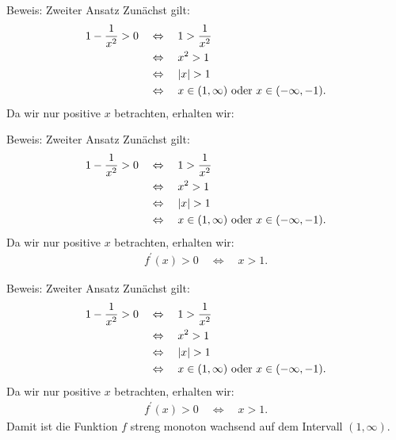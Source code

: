 \documentclass[10pt]{beamer}
\begin{document}
\begin{frame}{Beweis: Zweiter Ansatz}
    Zunächst gilt:
    \begin{align*}
        1 - \frac{1}{x^{2}} > 0 
        \quad & \Leftrightarrow \quad 1 > \frac{1}{x^{2}} \\
        \quad & \Leftrightarrow \quad x^{2} > 1 \\
        \quad & \Leftrightarrow \quad \left\vert x \right\vert > 1 \\
        \quad & \Leftrightarrow \quad \text{\( x \in \left(1, \infty \right)  \) oder \( x \in \left(- \infty, -1 \right) \)}.  
    \end{align*}
    Da wir nur positive \( x \) betrachten, erhalten wir:
\end{frame}



\begin{frame}{Beweis: Zweiter Ansatz}
    Zunächst gilt:
    \begin{align*}
        1 - \frac{1}{x^{2}} > 0 
        \quad & \Leftrightarrow \quad 1 > \frac{1}{x^{2}} \\
        \quad & \Leftrightarrow \quad x^{2} > 1 \\
        \quad & \Leftrightarrow \quad \left\vert x \right\vert > 1 \\
        \quad & \Leftrightarrow \quad \text{\( x \in \left(1, \infty \right)  \) oder \( x \in \left(- \infty, -1 \right) \)}.  
    \end{align*}
    Da wir nur positive \( x \) betrachten, erhalten wir:
    \begin{align*}
        f^{\prime}( x ) > 0 \quad \Leftrightarrow \quad x > 1.
    \end{align*}
\end{frame}



\begin{frame}{Beweis: Zweiter Ansatz}
    Zunächst gilt:
    \begin{align*}
        1 - \frac{1}{x^{2}} > 0 
        \quad & \Leftrightarrow \quad 1 > \frac{1}{x^{2}} \\
        \quad & \Leftrightarrow \quad x^{2} > 1 \\
        \quad & \Leftrightarrow \quad \left\vert x \right\vert > 1 \\
        \quad & \Leftrightarrow \quad \text{\( x \in \left(1, \infty \right)  \) oder \( x \in \left(- \infty, -1 \right) \)}.  
    \end{align*}
    Da wir nur positive \( x \) betrachten, erhalten wir:
    \begin{align*}
        f^{\prime}( x ) > 0 \quad \Leftrightarrow \quad x > 1.
    \end{align*}
    Damit ist die Funktion \( f \) streng monoton wachsend auf dem Intervall \( \left(1, \infty \right) \).
\end{frame}
\end{document}
